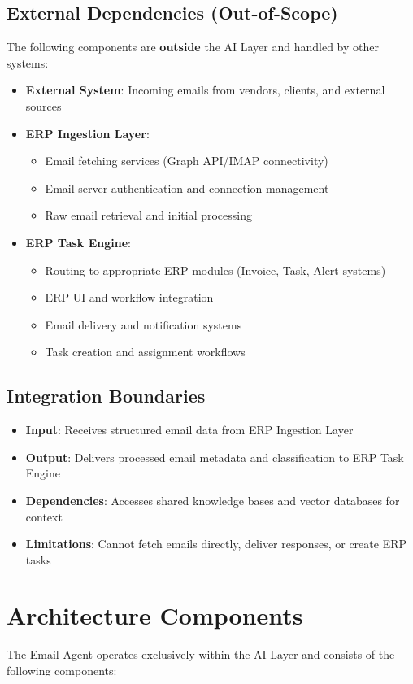 \documentclass[12pt]{report}
\begin{document}
\subsection{External Dependencies (Out-of-Scope)}
The following components are \textbf{outside} the AI Layer and handled by other systems:
\begin{itemize}
  \item \textbf{External System}: Incoming emails from vendors, clients, and external sources
  \item \textbf{ERP Ingestion Layer}:
    \begin{itemize}
      \item Email fetching services (Graph API/IMAP connectivity)
      \item Email server authentication and connection management
      \item Raw email retrieval and initial processing
    \end{itemize}
  \item \textbf{ERP Task Engine}:
    \begin{itemize}
      \item Routing to appropriate ERP modules (Invoice, Task, Alert systems)
      \item ERP UI and workflow integration
      \item Email delivery and notification systems
      \item Task creation and assignment workflows
    \end{itemize}
\end{itemize}

\subsection{Integration Boundaries}
\begin{itemize}
  \item \textbf{Input}: Receives structured email data from ERP Ingestion Layer
  \item \textbf{Output}: Delivers processed email metadata and classification to ERP Task Engine
  \item \textbf{Dependencies}: Accesses shared knowledge bases and vector databases for context
  \item \textbf{Limitations}: Cannot fetch emails directly, deliver responses, or create ERP tasks
\end{itemize}

\section{Architecture Components}
The Email Agent operates exclusively within the AI Layer and consists of the following components:
\end{document}
